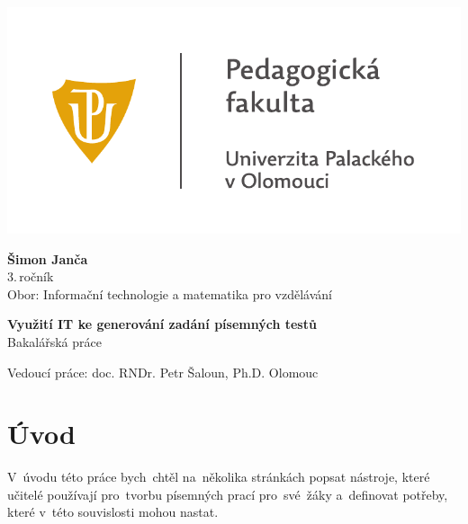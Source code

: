 \documentclass[14pt,a4paper]{article}
\begin{document}
	\begin{titlepage}
		\begin{center}
            {
            \centering
            \includegraphics[]{./img/UP_logo_PdF-UP_horizont_cz.pdf}
            }
			
			\vspace{3cm}

            {
                \LARGE
                \textbf{Šimon Janča}\\
                3.\,ročník\\[8mm]
                Obor: Informační technologie a matematika pro vzdělávání
            }

            \vspace{4cm}
			
			{
			    \textbf{\Huge Využití IT ke generování zadání písemných testů}\\[4mm]
			    \Large
			    Bakalářská práce
			}

            \vfill
            
            {
                Vedoucí práce:
                doc. RNDr. Petr Šaloun, Ph.D.
                \hfill
    			Olomouc \the\year{}
            }
			
		\end{center}
	\end{titlepage}
	\tableofcontents

	\newpage
    \clearpage
    \setcounter{page}{1}
	
	\section{Úvod}
    V~úvodu této práce bych~chtěl na~několika stránkách popsat nástroje, které učitelé používají pro~tvorbu písemných prací pro~své~žáky a~definovat potřeby, které v~této souvislosti mohou nastat.
    
\end{document}
